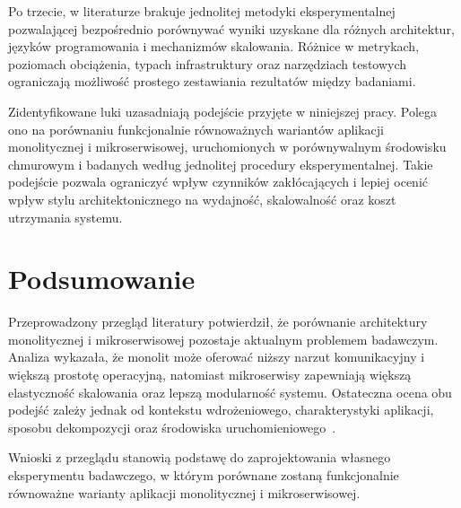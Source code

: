 Po trzecie, w literaturze brakuje jednolitej metodyki eksperymentalnej pozwalającej bezpośrednio porównywać wyniki uzyskane dla różnych architektur, języków programowania i mechanizmów skalowania. Różnice w metrykach, poziomach obciążenia, typach infrastruktury oraz narzędziach testowych ograniczają możliwość prostego zestawiania rezultatów między badaniami.

Zidentyfikowane luki uzasadniają podejście przyjęte w niniejszej pracy. Polega ono na porównaniu funkcjonalnie równoważnych wariantów aplikacji monolitycznej i mikroserwisowej, uruchomionych w porównywalnym środowisku chmurowym i badanych według jednolitej procedury eksperymentalnej. Takie podejście pozwala ograniczyć wpływ czynników zakłócających i lepiej ocenić wpływ stylu architektonicznego na wydajność, skalowalność oraz koszt utrzymania systemu.

\section{Podsumowanie}

Przeprowadzony przegląd literatury potwierdził, że porównanie architektury monolitycznej i mikroserwisowej pozostaje aktualnym problemem badawczym. Analiza wykazała, że monolit może oferować niższy narzut komunikacyjny i większą prostotę operacyjną, natomiast mikroserwisy zapewniają większą elastyczność skalowania oraz lepszą modularność systemu. Ostateczna ocena obu podejść zależy jednak od kontekstu wdrożeniowego, charakterystyki aplikacji, sposobu dekompozycji oraz środowiska uruchomieniowego~\cite{blinowski2022monolithic,okroj2023differences,mangwani2023evaluation,berry2024migrating}.

Wnioski z przeglądu stanowią podstawę do zaprojektowania własnego eksperymentu badawczego, w którym porównane zostaną funkcjonalnie równoważne warianty aplikacji monolitycznej i mikroserwisowej.